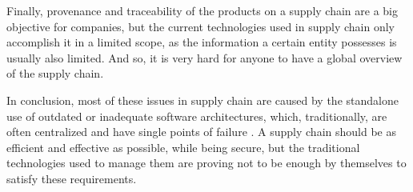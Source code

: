 Finally, provenance and traceability of the products on a supply chain are a big objective for companies, but the current technologies used in supply chain only accomplish it in a limited scope, as the information a certain entity possesses is usually also limited. And so, it is very hard for anyone to have a global overview of the supply chain.

In conclusion, most of these issues in supply chain are caused by the standalone use of outdated or inadequate software architectures, which, traditionally, are often centralized and have single points of failure . A supply chain should be as efficient and effective as possible, while being secure, but the traditional technologies used to manage them are proving not to be enough by themselves to satisfy these requirements.


